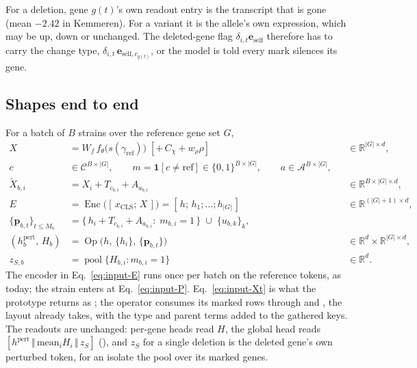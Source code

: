  For a deletion, gene $g(t)$'s own readout entry
is the transcript that is gone (mean $-2.42$ in Kemmeren). For a variant it is the
allele's own expression, which may be up, down or unchanged. The deleted-gene flag
$\delta_{i,t}\mathbf{e}_{\mathrm{self}}$ therefore has to carry the change type,
$\delta_{i,t}\,\mathbf{e}_{\mathrm{self},c_{g(t)}}$, or the model is told every mark
silences its gene.

\subsection{Shapes end to end}
\label{sec:input-shapes}

For a batch of $B$ strains over the reference gene set $G$,
\begin{align}
X &= W_f\,f_\theta\big(s(\gamma_{\mathrm{ref}})\big)\;[+\,C_\chi+w_\rho\rho]
  &&\in\mathbb{R}^{|G|\times d}, \label{eq:input-X}\\
c &\in\mathcal{C}^{B\times|G|},\qquad m=\mathbf{1}[c\neq\mathrm{ref}]\in\{0,1\}^{B\times|G|},\qquad
a\in\mathcal{A}^{B\times|G|}, \label{eq:input-c}\\
\tilde X_{b,i} &= X_i+T_{c_{b,i}}+A_{a_{b,i}} &&\in\mathbb{R}^{B\times|G|\times d}, \label{eq:input-Xt}\\
E &= \operatorname{Enc}\big([\,x_{\mathrm{CLS}};\,X\,]\big)=[\,h;\,h_1;\dots;h_{|G|}\,]
  &&\in\mathbb{R}^{(|G|+1)\times d}, \label{eq:input-E}\\
\{\mathbf{p}_{b,t}\}_{t\le M_b} &= \{\,h_i+T_{c_{b,i}}+A_{a_{b,i}}:\;m_{b,i}=1\,\}\;\cup\;\{u_{b,k}\}_k, \label{eq:input-P}\\
(h^{\mathrm{pert}}_b,\,H_b) &= \operatorname{Op}\big(h,\,\{h_i\},\,\{\mathbf{p}_{b,t}\}\big)
  &&\in\mathbb{R}^{d}\times\mathbb{R}^{|G|\times d}, \label{eq:input-H}\\
z_{S,b} &= \operatorname{pool}\{H_{b,i}:m_{b,i}=1\} &&\in\mathbb{R}^{d}. \label{eq:input-z}
\end{align}
The encoder in Eq.~\ref{eq:input-E} runs once per batch on the reference tokens, as
today; the strain enters at Eq.~\ref{eq:input-P}. Eq.~\ref{eq:input-Xt} is what the
prototype returns as ; the operator consumes its marked rows through
 and , the layout
 already takes, with the type and parent
terms added to the gathered keys. The readouts are unchanged: per-gene heads read $H$,
the global head reads $[h^{\mathrm{pert}}\,\Vert\,\mathrm{mean}_i H_i\,\Vert\,z_S]$
(), and $z_S$ for a single deletion is the deleted
gene's own perturbed token, for an isolate the pool over its marked genes.

